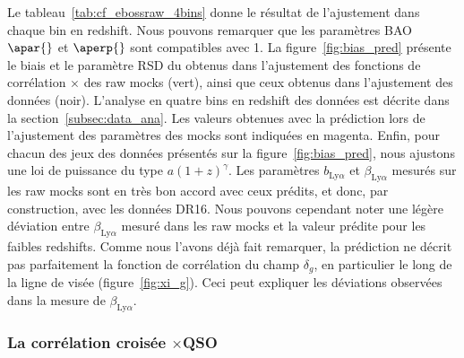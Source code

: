 Le tableau~\ref{tab:cf_ebossraw_4bins} donne le résultat de l'ajustement dans chaque bin en redshift.
Nous pouvons remarquer que les paramètres BAO $\apar{}$ et $\aperp{}$ sont compatibles avec 1.
La figure~\ref{fig:bias_pred} présente le biais et le paramètre RSD du \lya{} obtenus dans l'ajustement des fonctions de corrélation \lya{}$\times$\lya{} des raw mocks (vert), ainsi que ceux obtenus dans l'ajustement des données (noir). 
L'analyse en quatre bins en redshift des données est décrite dans la section~\ref{subsec:data_ana}.
Les valeurs obtenues avec la prédiction lors de l'ajustement des paramètres des mocks sont indiquées en magenta.
Enfin, pour chacun des jeux des données présentés sur la figure~\ref{fig:bias_pred}, nous ajustons une loi de puissance du type $a (1+z)^{\gamma}$.
Les paramètres $b_{\mathrm{Ly}\alpha}$ et $\beta_{\mathrm{Ly}\alpha}$ mesurés sur les raw mocks sont en très bon accord avec ceux prédits, et donc, par construction, avec les données DR16.
Nous pouvons cependant noter une légère déviation entre $\beta_{\mathrm{Ly}\alpha}$ mesuré dans les raw mocks et la valeur prédite pour les faibles redshifts.
Comme nous l'avons déjà fait remarquer, la prédiction ne décrit pas parfaitement la fonction de corrélation du champ $\delta_g$, en particulier le long de la ligne de visée (figure~\ref{fig:xi_g}). Ceci peut expliquer les déviations observées dans la mesure de $\beta_{\mathrm{Ly}\alpha}$.



\subsubsection{La corrélation croisée \lya{}$\times$QSO}

